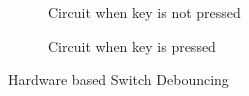 \documentclass[a4paper]{article} %
\begin{document}
        \begin{figure}[h!]
            \centering
            \begin{subfigure}[b]{0.49\linewidth}
                \centering
                \caption{Circuit when key is not pressed}
                \label{fg13a}
            \end{subfigure}
            \begin{subfigure}[b]{0.49\linewidth}
                \centering
                \caption{Circuit when key is pressed}
                \label{fg13b}
            \end{subfigure}
            \caption{Hardware based Switch Debouncing}
            \label{fg13}
        \end{figure}
    \newpage
        
\end{document}
